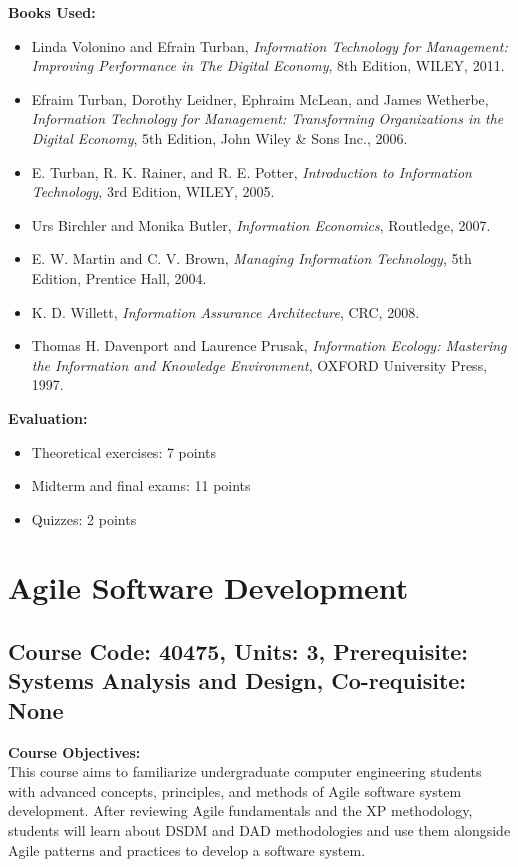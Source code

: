 \documentclass[12pt]{article}
\begin{document}
\textbf{Books Used:}
\begin{itemize}
    \item Linda Volonino and Efrain Turban, \textit{Information Technology for Management: Improving Performance in The Digital Economy}, 8th Edition, WILEY, 2011.
    \item Efraim Turban, Dorothy Leidner, Ephraim McLean, and James Wetherbe, \textit{Information Technology for Management: Transforming Organizations in the Digital Economy}, 5th Edition, John Wiley \& Sons Inc., 2006.
    \item E. Turban, R. K. Rainer, and R. E. Potter, \textit{Introduction to Information Technology}, 3rd Edition, WILEY, 2005.
    \item Urs Birchler and Monika Butler, \textit{Information Economics}, Routledge, 2007.
    \item E. W. Martin and C. V. Brown, \textit{Managing Information Technology}, 5th Edition, Prentice Hall, 2004.
    \item K. D. Willett, \textit{Information Assurance Architecture}, CRC, 2008.
    \item Thomas H. Davenport and Laurence Prusak, \textit{Information Ecology: Mastering the Information and Knowledge Environment}, OXFORD University Press, 1997.
\end{itemize}

\textbf{Evaluation:}
\begin{itemize}
    \item Theoretical exercises: 7 points
    \item Midterm and final exams: 11 points
    \item Quizzes: 2 points
\end{itemize}

\newpage

\section{Agile Software Development}
\subsection*{Course Code: 40475, Units: 3, Prerequisite: Systems Analysis and Design, Co-requisite: None}

\textbf{Course Objectives:} \\
This course aims to familiarize undergraduate computer engineering students with advanced concepts, principles, and methods of Agile software system development. After reviewing Agile fundamentals and the XP methodology, students will learn about DSDM and DAD methodologies and use them alongside Agile patterns and practices to develop a software system.
\end{document}
